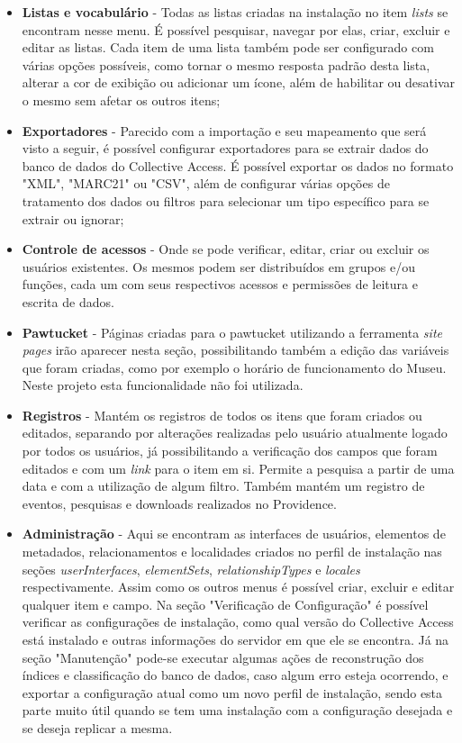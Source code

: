 \documentclass[a4paper,12pt,oneside,onecolumn,final,fleqn]{repUERJ}
\begin{document}
\begin{itemize}
	\item \textbf{Listas e vocabulário} - Todas as listas criadas na instalação no item \textit{lists} se encontram nesse menu. É possível pesquisar, navegar por elas, criar, excluir e editar as listas. Cada item de uma lista também pode ser configurado com várias opções possíveis, como tornar o mesmo resposta padrão desta lista, alterar a cor de exibição ou adicionar um ícone, além de habilitar ou desativar o mesmo sem afetar os outros itens;
	\item \textbf{Exportadores} - Parecido com a importação e seu mapeamento que será visto a seguir, é possível configurar exportadores para se extrair dados do banco de dados do Collective Access. É possível exportar os dados no formato "XML", "MARC21" ou "CSV", além de configurar várias opções de tratamento dos dados ou filtros para selecionar um tipo específico para se extrair ou ignorar;
	\item \textbf{Controle de acessos} - Onde se pode verificar, editar, criar ou excluir os usuários existentes. Os mesmos podem ser distribuídos em grupos e/ou funções, cada um com seus respectivos acessos e permissões de leitura e escrita de dados.
	\item \textbf{Pawtucket} - Páginas criadas para o pawtucket utilizando a ferramenta \textit{site pages} irão aparecer nesta seção, possibilitando também a edição das variáveis que foram criadas, como por exemplo o horário de funcionamento do Museu. Neste projeto esta funcionalidade não foi utilizada.
	\item \textbf{Registros} - Mantém os registros de todos os itens que foram criados ou editados, separando por alterações realizadas pelo usuário atualmente logado por todos os usuários, já possibilitando a verificação dos campos que foram editados e com um \textit{link} para o item em si. Permite a pesquisa a partir de uma data e com a utilização de algum filtro. Também mantém um registro de eventos, pesquisas e downloads realizados no Providence.
	\item \textbf{Administração} - Aqui se encontram as interfaces de usuários, elementos de metadados, relacionamentos e localidades criados no perfil de instalação nas seções \textit{userInterfaces}, \textit{elementSets}, \textit{relationshipTypes} e \textit{locales} respectivamente. Assim como os outros menus é possível criar, excluir e editar qualquer item e campo. Na seção "Verificação de Configuração" é possível verificar as configurações de instalação, como qual versão do Collective Access está instalado e outras informações do servidor em que ele se encontra. Já na seção "Manutenção" pode-se executar algumas ações de reconstrução dos índices e classificação do banco de dados, caso algum erro esteja ocorrendo, e exportar a configuração atual como um novo perfil de instalação, sendo esta parte muito útil quando se tem uma instalação com a configuração desejada e se deseja replicar a mesma.
\end{itemize}
\end{document}
